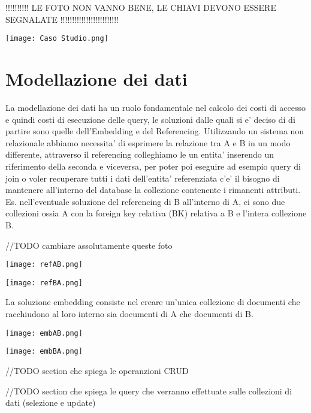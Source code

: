     !!!!!!!!!! LE FOTO NON VANNO BENE, LE CHIAVI DEVONO ESSERE SEGNALATE !!!!!!!!!!!!!!!!!!!!!!!!!
\begin{center}
    \texttt{[image: Caso Studio.png]}
\end{center}


\section{Modellazione dei dati}

La modellazione dei dati ha un ruolo fondamentale nel calcolo dei costi di accesso e quindi costi di esecuzione delle query, le soluzioni dalle quali si e' deciso di di partire 
sono quelle dell'Embedding e del Referencing. Utilizzando un sistema non relazionale abbiamo necessita' di esprimere la relazione tra A e B in un modo differente, attraverso il 
referencing colleghiamo le un entita' inserendo un riferimento della seconda e viceversa, per poter poi eseguire ad esempio query di join o voler recuperare tutti i dati 
dell'entita' referenziata c'e' il bisogno di mantenere all'interno del database la collezione contenente i rimanenti attributi. Es. nell'eventuale soluzione del referencing di B all'interno 
di A, ci sono due collezioni ossia A con la foreign key relativa (BK) relativa a B e l'intera collezione B. 

//TODO cambiare assolutamente queste foto
\begin{center}
    \texttt{[image: refAB.png]}
\end{center}

\begin{center}
    \texttt{[image: refBA.png]}
\end{center}

La soluzione embedding consiste nel creare un'unica collezione di documenti che racchiudono al loro interno sia documenti di A che documenti di B.

\begin{center}
    \texttt{[image: embAB.png]}
\end{center}

\begin{center}
    \texttt{[image: embBA.png]}
\end{center}

//TODO section che spiega le operanzioni CRUD

//TODO section che spiega le query  che verranno effettuate sulle collezioni di dati (selezione e update)

